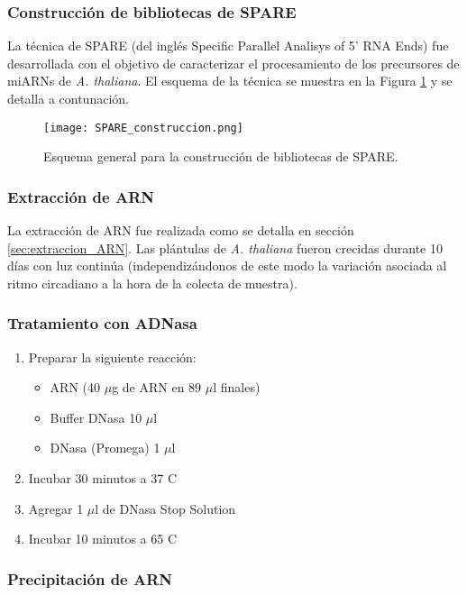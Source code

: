 \subsubsection{Construcción de bibliotecas de SPARE}

La técnica de SPARE (del inglés Specific Parallel Analisys of 5' RNA Ends) fue desarrollada con el objetivo de caracterizar el procesamiento de los precursores de miARNs de \textit{A. thaliana}.
El esquema de la técnica se muestra en la Figura \ref{fig:SPARE_construccion} y se detalla a contunación.

\begin{figure}[htbp!]
	\centering    
	\texttt{[image: SPARE\_construccion.png]}
	\caption[Esquema general para la construcción de bibliotecas de SPARE]{
		Esquema general para la construcción de bibliotecas de SPARE.
	}
	 \label{fig:SPARE_construccion}
\end{figure}

\subsubsection{Extracción de ARN}
La extracción de ARN fue realizada como se detalla en sección \ref{sec:extraccion_ARN}.
Las plántulas de \textit{A. thaliana} fueron crecidas durante 10 días con luz continúa (independizándonos de este modo la variación asociada al ritmo circadiano a la hora de la colecta de muestra).

\subsubsection{Tratamiento con ADNasa}

\begin{enumerate}
	\item Preparar la siguiente reacción:
		\begin{itemize}
			\item ARN (40 $\mu$g de ARN en 89 $\mu$l finales)
			\item Buffer DNasa 10 $\mu$l
			\item DNasa (Promega) 1 $\mu$l
		\end{itemize}
	\item Incubar 30 minutos a 37 \degree C
	\item Agregar 1 $\mu$l de DNasa Stop Solution
	\item Incubar 10 minutos a 65 \degree C
\end{enumerate}

\subsubsection{Precipitación de ARN}

